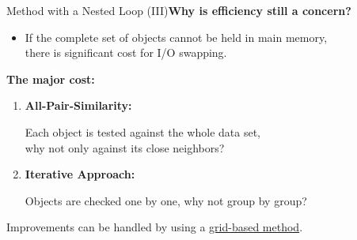 \begin{frame}{Method with a Nested Loop (III)}\textbf{Why is efficiency still a concern?}
	\begin{itemize}
		\item If the complete set of objects cannot be held in main memory, \\
		      there is significant cost for I/O swapping.
	\end{itemize}
	\textbf{The major cost:}
	\begin{enumerate}
		\item \textcolor{faugray}{\textbf{All-Pair-Similarity:}}

		      Each object is tested against the whole data set, \\
		      why not only against its close neighbors?
		\item \textcolor{faugray}{\textbf{Iterative Approach:}}

		      Objects are checked one by one, why not group by group?
	\end{enumerate}

	Improvements can be handled by using a \underline{grid-based method}.
\end{frame}


